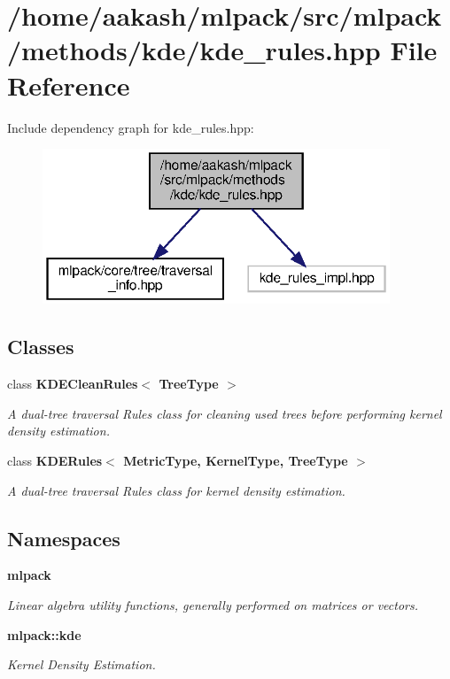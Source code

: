 \section{/home/aakash/mlpack/src/mlpack/methods/kde/kde\+\_\+rules.hpp File Reference}
\label{kde__rules_8hpp}
Include dependency graph for kde\+\_\+rules.\+hpp\+:
\nopagebreak
\begin{figure}[H]
\begin{center}
\leavevmode
\includegraphics[width=294pt]{kde__rules_8hpp__incl}
\end{center}
\end{figure}
\subsection*{Classes}
\begin{DoxyCompactItemize}
\item 
class \textbf{ K\+D\+E\+Clean\+Rules$<$ Tree\+Type $>$}
\begin{DoxyCompactList}\small\item\em A dual-\/tree traversal Rules class for cleaning used trees before performing kernel density estimation. \end{DoxyCompactList}\item 
class \textbf{ K\+D\+E\+Rules$<$ Metric\+Type, Kernel\+Type, Tree\+Type $>$}
\begin{DoxyCompactList}\small\item\em A dual-\/tree traversal Rules class for kernel density estimation. \end{DoxyCompactList}\end{DoxyCompactItemize}
\subsection*{Namespaces}
\begin{DoxyCompactItemize}
\item 
 \textbf{ mlpack}
\begin{DoxyCompactList}\small\item\em Linear algebra utility functions, generally performed on matrices or vectors. \end{DoxyCompactList}\item 
 \textbf{ mlpack\+::kde}
\begin{DoxyCompactList}\small\item\em Kernel Density Estimation. \end{DoxyCompactList}\end{DoxyCompactItemize}


